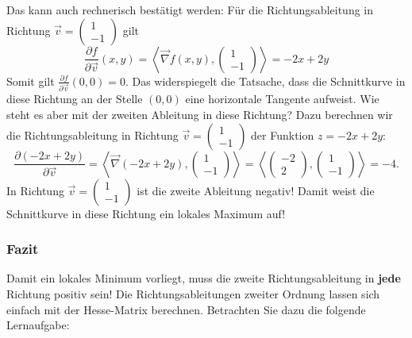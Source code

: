Das kann auch rechnerisch bestätigt werden: Für die Richtungsableitung in Richtung \(\vec{v}=\begin{pmatrix} 1 \\ -1 \end{pmatrix}\) gilt
\[
	\frac{\partial f}{\partial \vec{v}}(x, y) =\left\langle \vec\nabla f(x,y) , \begin{pmatrix} 1 \\ -1 \end{pmatrix} \right\rangle = -2x + 2y
\]
Somit gilt \(\frac{\partial f}{\partial \vec{v}}(0,0) = 0\). Das widerspiegelt die Tatsache, dass die Schnittkurve in diese Richtung an der Stelle \((0,0)\) eine horizontale Tangente aufweist. Wie steht es aber mit der zweiten Ableitung in diese Richtung? Dazu berechnen wir die Richtungsableitung in Richtung \(\vec{v}=\begin{pmatrix} 1 \\ -1 \end{pmatrix}\) der Funktion \(z = -2x + 2y\):
\[
	\frac{\partial \left( -2x + 2y \right)}{\partial \vec{v}}  = \left\langle \vec \nabla \left( -2x + 2y \right) , \begin{pmatrix} 1 \\ -1 \end{pmatrix} \right\rangle = \left\langle \begin{pmatrix} -2 \\ 2 \end{pmatrix}, \begin{pmatrix} 1 \\ -1 \end{pmatrix} \right\rangle = -4.
\]
In Richtung \(\vec{v}=\begin{pmatrix} 1 \\ -1 \end{pmatrix}\) ist die zweite Ableitung negativ! Damit weist die Schnittkurve in diese Richtung ein lokales Maximum auf!


\subsubsection*{Fazit}
Damit ein lokales Minimum vorliegt, muss die zweite Richtungsableitung in \textbf{jede} Richtung positiv sein! Die Richtungsableitungen zweiter Ordnung lassen sich einfach mit der Hesse-Matrix berechnen. Betrachten Sie dazu die folgende Lernaufgabe:


